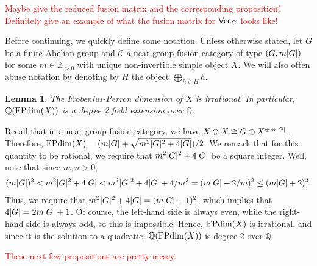 \documentclass[12pt, reqno]{amsart}
\numberwithin{equation}{section}
\theoremstyle{plainspace}
\newtheorem{lemma}[theorem]{Lemma}
\theoremstyle{definitionspace}
\theoremstyle{remarkspace}
\renewenvironment{proof}{{\noindent\textbf{Proof.}}}{\null\hfill\qedsymbol}
\DeclarePairedDelimiter{\abs}{\lvert}{\rvert}
\newcommand{\mathcat}[1]{\mathcal{#1}}
\newcommand{\textcat}[1]{\textup{\textsf{#1}}}
\newcommand{\FPdim}{\textup{FPdim}}
\begin{document}
\noindent \textcolor{red}{Maybe give the reduced fusion matrix and the corresponding proposition! Definitely give an example of what the fusion matrix for $\textcat{Vec}_G$ looks like!}
\newline

\noindent Before continuing, we quickly define some notation. Unless otherwise stated, let $G$ be a finite Abelian group and $\mathcat{C}$ a near-group fusion category of type $(G, m\abs{G})$ for some $m \in \mathbb{Z}_{>0}$ with unique non-invertible simple object $X$. We will also often abuse notation by denoting by $H$ the object $\bigoplus_{h \in H}{h}$.
\newline

\begin{lemma}\label{lem:near-group_non-invertible_irrational}
The Frobenius-Perron dimension of $X$ is irrational. In particular, $\mathbb{Q}(\FPdim(X))$ is a degree 2 field extension over $\mathbb{Q}$.
\end{lemma}
\leavevmode\newline
\begin{proof}
Recall that in a near-group fusion category, we have $X \otimes X \cong G \oplus X^{\oplus m\abs{G}}$. Therefore, $\FPdim(X) = (m\abs{G} + \sqrt{m^2\abs{G}^2 + 4\abs{G}})/2$. We remark that for this quantity to be rational, we require that $m^2\abs{G}^2 + 4\abs{G}$ be a square integer. Well, note that since $m, n > 0$,
\begin{align*}
\begin{split}
(m\abs{G})^2 < m^2\abs{G}^2 + 4\abs{G} < m^2\abs{G}^2 + 4\abs{G} + 4/m^2 = (m\abs{G} + 2/m)^2 \leq (m\abs{G} + 2)^2.
\end{split}
\end{align*}
Thus, we require that $m^2\abs{G}^2 + 4\abs{G} = (m\abs{G} + 1)^2$, which implies that $4\abs{G} = 2m\abs{G} + 1$. Of course, the left-hand side is always even, while the right-hand side is always odd, so this is impossible. Hence, $\FPdim(X)$ is irrational, and since it is the solution to a quadratic, $\mathbb{Q}(\FPdim(X))$ is degree 2 over $\mathbb{Q}$.
\end{proof}
\newline

\noindent \textcolor{red}{These next few propositions are pretty messy.}
\newline
\end{document}
